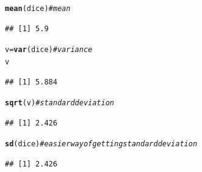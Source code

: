 \documentclass[12pt]{article}\usepackage[]{graphicx}\usepackage[]{color}
\makeatletter
\newcommand{\hlcom}[1]{\textcolor[rgb]{0.678,0.584,0.686}{\textit{#1}}}%
\newcommand{\hlstd}[1]{\textcolor[rgb]{0.345,0.345,0.345}{#1}}%
\newcommand{\hlkwb}[1]{\textcolor[rgb]{0.69,0.353,0.396}{#1}}%
\newcommand{\hlkwd}[1]{\textcolor[rgb]{0.737,0.353,0.396}{\textbf{#1}}}%
\newenvironment{kframe}{%
 \def\at@end@of@kframe{}%
 \ifinner\ifhmode%
  \def\at@end@of@kframe{\end{minipage}}%
  \begin{minipage}{\columnwidth}%
 \fi\fi%
 \def\FrameCommand##1{\hskip\@totalleftmargin \hskip-\fboxsep
 \colorbox{shadecolor}{##1}\hskip-\fboxsep
     \hskip-\linewidth \hskip-\@totalleftmargin \hskip\columnwidth}%
 \MakeFramed {\advance\hsize-\width
   \@totalleftmargin\z@ \linewidth\hsize
   \@setminipage}}%
 {\par\unskip\endMakeFramed%
 \at@end@of@kframe}
\newenvironment{knitrout}{}{} %
\makeatother
\begin{document}
\begin{knitrout}
\begin{kframe}
\begin{alltt}
\hlkwd{mean}\hlstd{(dice)}  \hlcom{#mean}
\end{alltt}
\begin{verbatim}
## [1] 5.9
\end{verbatim}
\begin{alltt}
\hlstd{v} \hlkwb{=} \hlkwd{var}\hlstd{(dice)}  \hlcom{#variance}
\hlstd{v}
\end{alltt}
\begin{verbatim}
## [1] 5.884
\end{verbatim}
\begin{alltt}
\hlkwd{sqrt}\hlstd{(v)}  \hlcom{#standard deviation}
\end{alltt}
\begin{verbatim}
## [1] 2.426
\end{verbatim}
\begin{alltt}
\hlkwd{sd}\hlstd{(dice)}  \hlcom{#easier way of getting standard deviation}
\end{alltt}
\begin{verbatim}
## [1] 2.426
\end{verbatim}
\end{kframe}
\end{knitrout}
\end{document}

